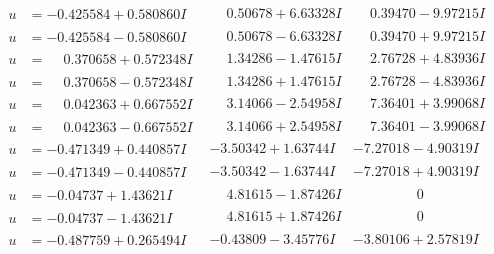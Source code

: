 \documentclass[1p]{elsarticle_modified}
\theoremstyle{definition}
\begin{document}
$$\begin{array}{c|c|c}
\begin{aligned}
u &= -0.425584 + 0.580860 I\end{aligned}
 & \phantom{-}0.50678 + 6.63328 I & \phantom{-}0.39470 - 9.97215 I \\ \hline\begin{aligned}
u &= -0.425584 - 0.580860 I\end{aligned}
 & \phantom{-}0.50678 - 6.63328 I & \phantom{-}0.39470 + 9.97215 I \\ \hline\begin{aligned}
u &= \phantom{-}0.370658 + 0.572348 I\end{aligned}
 & \phantom{-}1.34286 - 1.47615 I & \phantom{-}2.76728 + 4.83936 I \\ \hline\begin{aligned}
u &= \phantom{-}0.370658 - 0.572348 I\end{aligned}
 & \phantom{-}1.34286 + 1.47615 I & \phantom{-}2.76728 - 4.83936 I \\ \hline\begin{aligned}
u &= \phantom{-}0.042363 + 0.667552 I\end{aligned}
 & \phantom{-}3.14066 - 2.54958 I & \phantom{-}7.36401 + 3.99068 I \\ \hline\begin{aligned}
u &= \phantom{-}0.042363 - 0.667552 I\end{aligned}
 & \phantom{-}3.14066 + 2.54958 I & \phantom{-}7.36401 - 3.99068 I \\ \hline\begin{aligned}
u &= -0.471349 + 0.440857 I\end{aligned}
 & -3.50342 + 1.63744 I & -7.27018 - 4.90319 I \\ \hline\begin{aligned}
u &= -0.471349 - 0.440857 I\end{aligned}
 & -3.50342 - 1.63744 I & -7.27018 + 4.90319 I \\ \hline\begin{aligned}
u &= -0.04737 + 1.43621 I\end{aligned}
 & \phantom{-}4.81615 - 1.87426 I & \phantom{-0.000000 } 0 \\ \hline\begin{aligned}
u &= -0.04737 - 1.43621 I\end{aligned}
 & \phantom{-}4.81615 + 1.87426 I & \phantom{-0.000000 } 0 \\ \hline\begin{aligned}
u &= -0.487759 + 0.265494 I\end{aligned}
 & -0.43809 - 3.45776 I & -3.80106 + 2.57819 I \\ \hline\begin{aligned}

\end{aligned}
\end{array}$$
\end{document}
